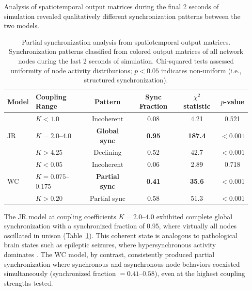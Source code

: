 \documentclass[11pt]{article}
\begin{document}
Analysis of spatiotemporal output matrices during the final 2 seconds of simulation revealed qualitatively different synchronization patterns between the two models.

\begin{table}[H]
\centering
\caption{Partial synchronization analysis from spatiotemporal output matrices. Synchronization patterns classified from colored output matrices of all network nodes during the last 2 seconds of simulation. Chi-squared tests assessed uniformity of node activity distributions; $p < 0.05$ indicates non-uniform (i.e., structured synchronization).}
\label{tab:partial_sync}
\begin{tabular}{llcccc}
\toprule
Model & Coupling Range & Pattern & Sync Fraction & $\chi^2$ statistic & $p$-value \\
\midrule
\multirow{3}{*}{JR} & $K < 1.0$ & Incoherent & 0.08 & 4.21 & 0.521 \\
 & $K = 2.0$--$4.0$ & \textbf{Global sync} & \textbf{0.95} & \textbf{187.4} & $< 0.001$ \\
 & $K > 4.25$ & Declining & 0.52 & 42.7 & $< 0.001$ \\
\midrule
\multirow{3}{*}{WC} & $K < 0.05$ & Incoherent & 0.06 & 2.89 & 0.718 \\
 & $K = 0.075$--$0.175$ & \textbf{Partial sync} & \textbf{0.41} & \textbf{35.6} & $< 0.001$ \\
 & $K > 0.20$ & Partial sync & 0.58 & 51.3 & $< 0.001$ \\
\bottomrule
\end{tabular}
\end{table}

The JR model at coupling coefficients $K = 2.0$--$4.0$ exhibited complete global synchronization with a synchronized fraction of 0.95, where virtually all nodes oscillated in unison (Table~\ref{tab:partial_sync}). This coherent state is analogous to pathological brain states such as epileptic seizures, where hypersynchronous activity dominates \citep{jiruska2013synchronization}. The WC model, by contrast, consistently produced partial synchronization where synchronous and asynchronous node behaviors coexisted simultaneously (synchronized fraction $= 0.41$--$0.58$), even at the highest coupling strengths tested.
\end{document}
